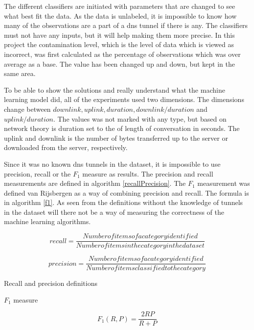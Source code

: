 The different classifiers are initiated with parameters that are changed to see what best fit the data. As the data is unlabeled, it is impossible to know how many of the observations are a part of a \gls{dns} tunnel if there is any. The classifiers must not have any inputs, but it will help making them more precise. In this project the contamination level, which is the level of data which is viewed as incorrect, was first calculated as the percentage of observations which was over average as a base. The value has been changed up and down, but kept in the same area. 

To be able to show the solutions and really understand what the machine learning model did, all of the experiments used two dimensions. The dimensions change between $downlink, uplink, duration, downlink/duration$ and $uplink/duration$. The values was not marked with any type, but based on network theory is duration set to the of length of conversation in seconds. The uplink and downlink is  the number of bytes transferred up to the server or downloaded from the server, respectively.

Since it was no known \gls{dns} tunnels in the dataset, it is impossible to use precision, recall or the $F_1$ measure as results. The precision and recall measurements are defined in algorithm \ref{recallPrecision}. The $F_1$ measurement was defined van Rijsbergen \cite{manevitz2002one} as a way of combining precision and recall. The formula is in algorithm \ref{f1}. As seen from the definitions without the knowledge of tunnels in the dataset will there not be a way of measuring the correctness of the machine learning algorithms.

\begin{algorithm}

$$ recall = \frac{Number of items of a category identified}{Number of items in the category in the dataset} $$

$$ precision = \frac{Number of items of a category identified}{Number of items classified to the category} $$

\caption{Recall and precision definitions}
\label{recallPrecision}
\end{algorithm}

\begin{algorithm}
\caption{$F_1$ measure}
\label{f1}
$$ F_1(R,P) = \frac{2RP}{R+P} $$
\end{algorithm}


